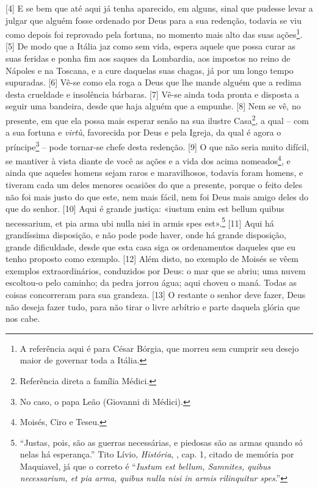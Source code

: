 {[}4{]} E se bem que até aqui já tenha aparecido, em alguns, sinal que
pudesse levar a julgar que alguém fosse ordenado por Deus para a sua
redenção, todavia se viu como depois foi reprovado pela fortuna, no
momento mais alto das suas ações\footnote{A referência aqui é para César
  Bórgia, que morreu sem cumprir seu desejo maior de governar toda a
  Itália.}. {[}5{]} De modo que a Itália jaz como sem vida, espera
aquele que possa curar as suas feridas e ponha fim aos saques da
Lombardia, aos impostos no reino de Nápoles e na Toscana, e a cure
daquelas suas chagas, já por um longo tempo supuradas. {[}6{]} Vê-se
como ela roga a Deus que lhe mande alguém que a redima desta crueldade e
insolência bárbaras. {[}7{]} Vê-se ainda toda pronta e disposta a seguir
uma bandeira, desde que haja alguém que a empunhe. {[}8{]} Nem se vê, no
presente, em que ela possa mais esperar senão na sua ilustre
Casa\footnote{Referência direta a família Médici.}, a qual -- com a sua
fortuna e \emph{virtù}, favorecida por Deus e pela Igreja, da qual é
agora o príncipe\footnote{No caso, o papa Leão  (Giovanni di Médici).}
-- pode tornar-se chefe desta redenção. {[}9{]} O que não seria muito
difícil, se mantiver à vista diante de você as ações e a vida dos acima
nomeados\footnote{Moisés, Ciro e Teseu.}, e ainda que aqueles homens
sejam raros e maravilhosos, todavia foram homens, e tiveram cada um
deles menores ocasiões do que a presente, porque o feito deles não foi
mais justo do que este, nem mais fácil, nem foi Deus mais amigo deles do
que do senhor. {[}10{]} Aqui é grande justiça: «iustum enim est bellum
quibus necessarium, et pia arma ubi nulla nisi in armis spes
est».\footnote{``Justas, pois, são as guerras necessárias, e piedosas
  são as armas quando só nelas há esperança.'' Tito Lívio,
  \emph{História}, , cap. 1, citado de memória por Maquiavel, já
  que o correto é ``\emph{Iustum est bellum, Samnites, quibus
  necessarium, et pia arma, quibus nulla nisi in armis rilinquitur
  spes}.''} {[}11{]} Aqui há grandíssima disposição, e não pode pode
haver, onde há grande disposição, grande dificuldade, desde que esta
casa siga os ordenamentos daqueles que eu tenho proposto como exemplo.
{[}12{]} Além disto, no exemplo de Moisés se vêem exemplos
extraordinários, conduzidos por Deus: o mar que se abriu; uma nuvem
escoltou-o pelo caminho; da pedra jorrou água; aqui choveu o maná. Todas
as coisas concorreram para sua grandeza. {[}13{]} O restante o senhor
deve fazer, Deus não deseja fazer tudo, para não tirar o livre arbítrio
e parte daquela glória que nos cabe.

